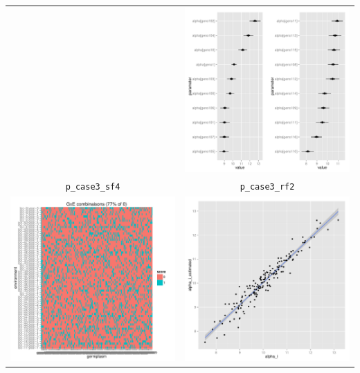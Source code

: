 \documentclass{book}\usepackage[]{graphicx}\usepackage[]{color}
\newenvironment{knitrout}{}{} %
\begin{document}
\begin{center}
\begin{tabular}{cc}
\begin{knitrout}
{}



\end{knitrout}
&
\begin{knitrout}
\definecolor{shadecolor}{rgb}{0.969, 0.969, 0.969}\color{fgcolor}

{\centering \includegraphics[width=.4\textwidth]{figures/PPBstats_unnamed-chunk-35-1} 

}



\end{knitrout}
\\
\texttt{p\_case3\_sf4} & \texttt{p\_case3\_rf2} \\
\begin{knitrout}
\definecolor{shadecolor}{rgb}{0.969, 0.969, 0.969}\color{fgcolor}

{\centering \includegraphics[width=.4\textwidth]{figures/PPBstats_unnamed-chunk-36-1} 

}



\end{knitrout}
&
\begin{knitrout}
\definecolor{shadecolor}{rgb}{0.969, 0.969, 0.969}\color{fgcolor}

{\centering \includegraphics[width=.4\textwidth]{figures/PPBstats_unnamed-chunk-37-1} 

}
\end{knitrout}
\end{tabular}
\end{center}
\end{document}
